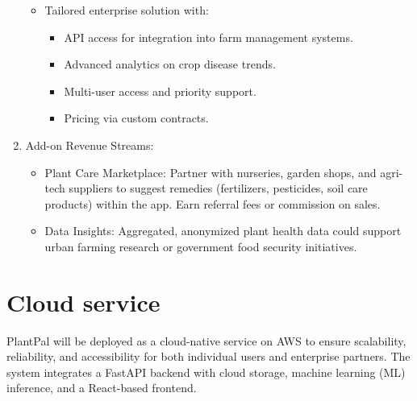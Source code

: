\documentclass[11pt]{article}
\begin{document}
\begin{enumerate}
\begin{itemize}
        \item Tailored enterprise solution with:
        \begin{itemize}
            \item API access for integration into farm management systems.
            \item Advanced analytics on crop disease trends.
            \item Multi-user access and priority support.
            \item Pricing via custom contracts.
        \end{itemize}
    \end{itemize}
    \item Add-on Revenue Streams:
    \begin{itemize}
        \item Plant Care Marketplace: Partner with nurseries, garden shops, and agri-tech suppliers to suggest remedies (fertilizers, pesticides, soil care products) within the app. Earn referral fees or commission on sales.
        \item Data Insights: Aggregated, anonymized plant health data could support urban farming research or government food security initiatives.
    \end{itemize}
\end{enumerate}

\section{Cloud service}

PlantPal will be deployed as a cloud-native service on AWS to ensure scalability, reliability, and accessibility for both individual users and enterprise partners. The system integrates a FastAPI backend with cloud storage, machine learning (ML) inference, and a React-based frontend.
\end{document}
